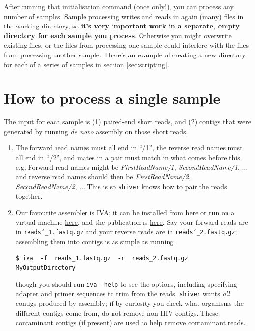 \documentclass{article}
\newcommand{\shiv}{\c{shiver}\xspace}
\let\c\texttt
\newcommand{\www}{\color{blue} \underline}
\begin{document}
After running that initialisation command (once only!), you can process any number of samples.
Sample processing writes and reads in again (many) files in the working directory, so {\bf it's very important work in a separate, empty directory for each sample you process}.
Otherwise you might overwrite existing files, or the files from processing one sample could interfere with the files from processing another sample.
There's an example of creating a new directory for each of a series of samples in section \ref{sec:scripting}.

\section{How to process a single sample} \label{sec:SingleSample}

The input for each sample is (1) paired-end short reads, and (2) contigs that were generated by running {\it de novo} assembly on those short reads.
\begin{enumerate}
\item The forward read names must all end in ``/1'', the reverse read names must all end in ``/2'', and mates in a pair must match in what comes before this.
e.g. Forward read names might be {\it FirstReadName/1}, {\it SecondReadName/1}, $\ldots$ and reverse read names should then be {\it FirstReadName/2}, {\it SecondReadName/2}, $\ldots$ This is so \shiv knows how to pair the reads together.
\item Our favourite assembler is IVA; it can be installed from \href{http://sanger-pathogens.github.io/iva/}{\www{here}} or run on a virtual machine \href{http://sanger-pathogens.github.io/pathogens-vm/}{\www{here}}, and the publication is \href{http://bioinformatics.oxfordjournals.org/content/early/2015/02/27/bioinformatics.btv120.abstract}{\www{here}}.
Say your forward reads are in \c{reads\char`_1.fastq.gz} and your reverse reads are in \c{reads\char`_2.fastq.gz}; assembling them into contigs is as simple as running
\begin{Verbatim}[samepage=true]
$ iva  -f  reads_1.fastq.gz  -r  reads_2.fastq.gz  MyOutputDirectory
\end{Verbatim}
though you should run \c{iva --help} to see the options, including specifying adapter and primer sequences to trim from the reads.
\shiv wants {\it all} contigs produced by assembly; if by curiosity you check what organisms the different contigs come from, do not remove non-HIV contigs.
These contaminant contigs (if present) are used to help remove contaminant reads.
\end{enumerate}
\end{document}
